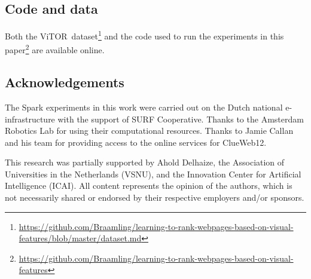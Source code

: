 \documentclass[sigconf,screen=true,natbib]{acmart}
\newcommand{\datasetname}{\ac{ViTOR}}
\begin{document}




\maketitle










\subsection*{Code and data}

Both the \datasetname~dataset\footnote{\url{https://github.com/Braamling/learning-to-rank-webpages-based-on-visual-features/blob/master/dataset.md}} and the code used to run the experiments in this paper\footnote{\url{https://github.com/Braamling/learning-to-rank-webpages-based-on-visual-features}} are available online.

\subsection*{Acknowledgements}
The Spark experiments in this work were carried out on the Dutch national e-infrastructure with the support of SURF Cooperative. Thanks to the Amsterdam Robotics Lab for using their computational resources. Thanks to Jamie Callan and his team for providing access to the online services for ClueWeb12. 

This research was partially supported by
%
Ahold Delhaize,
%
the Association of Universities in the Netherlands (VSNU),
%
and
%
the Innovation Center for Artificial Intelligence (ICAI).
%
All content represents the opinion of the authors, which is not necessarily shared or endorsed by their respective employers and/or sponsors.



 
\end{document}
